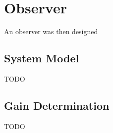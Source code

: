 \section{Observer}

An observer was then designed

\subsection{System Model}

TODO

\subsection{Gain Determination}

TODO